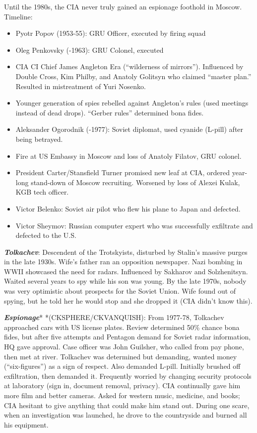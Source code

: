 \documentclass[
]{article}
\begin{document}
Until the 1980s, the CIA never truly gained an espionage foothold in
Moscow. Timeline:

\begin{itemize}
\item
  Pyotr Popov (1953-55): GRU Officer, executed by firing squad
\item
  Oleg Penkovsky (-1963): GRU Colonel, executed
\item
  CIA CI Chief James Angleton Era (``wilderness of mirrors'').
  Influenced by Double Cross, Kim Philby, and Anatoly Golitsyn who
  claimed ``master plan.'' Resulted in mistreatment of Yuri Nosenko.
\item
  Younger generation of spies rebelled against Angleton's rules (used
  meetings instead of dead drops). ``Gerber rules'' determined bona
  fides.
\item
  Aleksander Ogorodnik (-1977): Soviet diplomat, used cyanide (L-pill)
  after being betrayed.
\item
  Fire at US Embassy in Moscow and loss of Anatoly Filatov, GRU colonel.
\item
  President Carter/Stansfield Turner promised new leaf at CIA, ordered
  year-long stand-down of Moscow recruiting. Worsened by loss of Alexei
  Kulak, KGB tech officer.
\item
  Victor Belenko: Soviet air pilot who flew his plane to Japan and
  defected.
\item
  Victor Sheymov: Russian computer expert who was successfully
  exfiltrate and defected to the U.S.
\end{itemize}

\textbf{\emph{Tolkachev}}: Descendent of the Trotskyists, disturbed by
Stalin's massive purges in the late 1930s. Wife's father ran an
opposition newspaper. Nazi bombing in WWII showcased the need for
radars. Influenced by Sakharov and Solzhenitsyn. Waited several years to
spy while his son was young. By the late 1970s, nobody was very
optimistic about prospects for the Soviet Union. Wife found out of
spying, but he told her he would stop and she dropped it (CIA didn't
know this).

\textbf{\emph{Espionage}}* *(CKSPHERE/CKVANQUISH): From 1977-78,
Tolkachev approached cars with US license plates. Review determined 50\%
chance bona fides, but after five attempts and Pentagon demand for
Soviet radar information, HQ gave approval. Case officer was John
Guilsher, who called from pay phone, then met at river. Tolkachev was
determined but demanding, wanted money (``six-figures'') as a sign of
respect. Also demanded L-pill. Initially brushed off exfiltration, then
demanded it. Frequently worried by changing security protocols at
laboratory (sign in, document removal, privacy). CIA continually gave
him more film and better cameras. Asked for western music, medicine, and
books; CIA hesitant to give anything that could make him stand out.
During one scare, when an investigation was launched, he drove to the
countryside and burned all his equipment.
\end{document}
